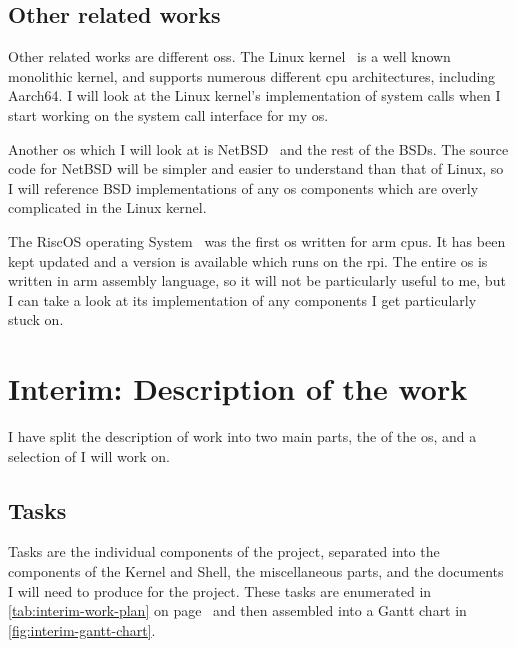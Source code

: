 \documentclass{article}
\begin{document}
\begin{refsection}
\subsection{Other related works}

Other related works are different \glspl{os}. The Linux
kernel~\cite{linux-kernel-git} is a well known monolithic kernel, and supports
numerous different \gls{cpu} architectures, including Aarch64. I will look at
the Linux kernel's implementation of system calls when I start working on the
system call interface for my \gls{os}.

Another \gls{os} which I will look at is NetBSD~\cite{netBSD-git} and the rest
of the BSDs. The source code for NetBSD will be simpler and easier to
understand than that of Linux, so I will reference BSD implementations of any
\gls{os} components which are overly complicated in the Linux kernel.

The RiscOS operating System~\cite{riscOS-source} was the first \gls{os} written
for \gls{arm} \glspl{cpu}. It has been kept updated and a version is available
which runs on the \gls{rpi}. The entire \gls{os} is written in \gls{arm}
assembly language, so it will not be particularly useful to me, but I can take
a look at its implementation of any components I get particularly stuck on.

\printbibliography[heading=relworks]

\end{refsection}
\section{Interim: Description of the work}
I have split the description of work into two main parts, the
 of the \gls{os}, and a selection of
 I will work on.

\subsection{Tasks}
\label{sec:tasks}
Tasks are the individual components of the project, separated into the
components of the Kernel and Shell, the miscellaneous parts, and the documents
I will need to produce for the project. These tasks are enumerated in
\autoref{tab:interim-work-plan} on page~\pageref*{tab:interim-work-plan} and then assembled into
a Gantt chart in \autoref{fig:interim-gantt-chart}.
\end{document}

